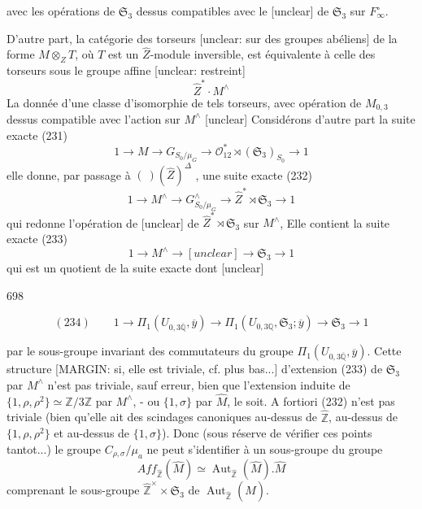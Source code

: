 \newpage


avec les opérations de $\mathfrak{S}_3$ dessus compatibles
avec le [unclear] de $\mathfrak{S}_3$ sur $F_\infty^\circ$.

D'autre part, la catégorie des torseurs
[unclear: sur des groupes abéliens] de la
forme $M \otimes_Z T$, où $T$ est un $\hat{Z}$-module
inversible, est équivalente à celle des
torseurs sous le groupe affine [unclear: restreint]
$$ \hat{Z}^* \cdot M^\wedge $$
La donnée d'une classe d'isomorphie
de tels torseurs, avec opération de
$M_{0,3}$ dessus compatible avec l'action
sur $M^\wedge$ [unclear] Considérons d'autre part
la suite exacte
(231) $$ 1 \to M \to G_{S_0/\mu_G} \to \mathcal{O}_{12}^* \rtimes (\mathfrak{S}_3)_{S_0} \to 1 $$
elle donne, par passage à
$( \ )(\hat{Z})^\Delta$ , une suite exacte
(232) $$ 1 \to M^\wedge \to G_{S_0/\mu_G}^\wedge \to \hat{Z}^* \rtimes \mathfrak{S}_3 \to 1 $$
qui redonne l'opération de [unclear]
de $\hat{Z}^* \rtimes \mathfrak{S}_3$ sur $M^\wedge$, Elle contient
la suite exacte
(233) $$ 1 \to M^\wedge \to [unclear] \to \mathfrak{S}_3 \to 1 $$
qui est un quotient de la suite exacte
dont [unclear]

\newpage


698

$$ (234) \qquad 1 \to \Pi_1(U_{0,3 \overline{\mathbb{Q}}}, \overline{y}) \to \Pi_1(U_{0,3 \mathbb{Q}}, \mathfrak{S}_3; \overline{y}) \to \mathfrak{S}_3 \to 1 $$

par le sous-groupe invariant des commutateurs
du groupe $\Pi_1(U_{0,3 \overline{\mathbb{Q}}}, \overline{y})$. Cette structure
[MARGIN: si, elle est triviale, cf. plus bas...]
d'extension (233) de $\mathfrak{S}_3$ par $M^\wedge$ n'est pas
triviale, sauf erreur, bien que l'extension
induite de $\{1, \rho, \rho^2\} \simeq \mathbb{Z}/3\mathbb{Z}$ par $M^\wedge$, - ou
$\{1, \sigma\}$ par $\hat{M}$, le soit. A fortiori (232) n'est
pas triviale (bien qu'elle ait des scindages
canoniques au-dessus de $\hat{\mathbb{Z}}$, au-dessus de
$\{1, \rho, \rho^2\}$ et au-dessus de $\{1, \sigma\}$). Donc
(sous réserve de vérifier ces points tantot...)
le groupe $C_{\rho,\sigma}/\mu_a$ ne peut s'identifier
à un sous-groupe du groupe 
$$ \boxed{ Aff_{\hat{\mathbb{Z}}}(\hat{M}) \simeq \operatorname{Aut}_{\hat{\mathbb{Z}}}(\hat{M}). \hat{M} } $$
comprenant le sous-groupe $\hat{\mathbb{Z}}^\times \times \mathfrak{S}_3$ de $\operatorname{Aut}_{\hat{\mathbb{Z}}}(\hat{M})$.

